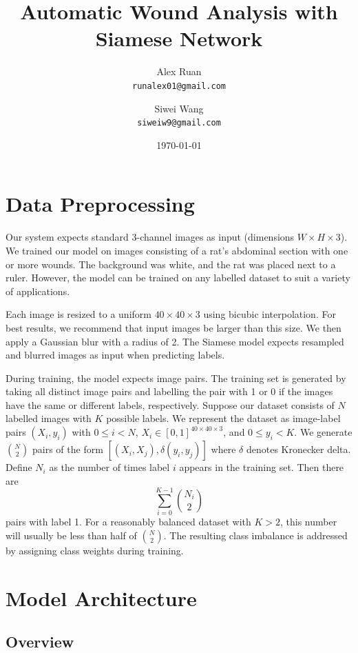 \documentclass[12pt]{article}
\title{Automatic Wound Analysis with Siamese Network}
\author{Alex Ruan \\ \texttt{runalex01@gmail.com} \and Siwei Wang \\ \texttt{siweiw9@gmail.com}}
\date{\today}
\begin{document}
\maketitle
\onehalfspacing

\section{Data Preprocessing} \label{sec:data_preprocessing}

Our system expects standard 3-channel images as input (dimensions \(W \times H \times 3\)). We trained our model on images consisting of a rat's abdominal section with one or more wounds. The background was white, and the rat was placed next to a ruler. However, the model can be trained on any labelled dataset to suit a variety of applications.

Each image is resized to a uniform \(40 \times 40 \times 3\) using bicubic interpolation. For best results, we recommend that input images be larger than this size. We then apply a Gaussian blur with a radius of 2. The Siamese model expects resampled and blurred images as input when predicting labels.

During training, the model expects image pairs. The training set is generated by taking all distinct image pairs and labelling the pair with 1 or 0 if the images have the same or different labels, respectively. Suppose our dataset consists of \(N\) labelled images with \(K\) possible labels. We represent the dataset as image-label pairs \((X_i, y_i)\) with \(0 \leq i < N\), \(X_i \in [0, 1]^{40 \times 40 \times 3}\), and \(0 \leq y_i < K\). We generate \(\binom{N}{2}\) pairs of the form \([(X_i, X_j), \delta(y_i, y_j)]\) where \(\delta\) denotes Kronecker delta. Define \(N_i\) as the number of times label \(i\) appears in the training set. Then there are
\begin{equation}
    \sum_{i = 0}^{K - 1} \binom{N_i}{2} \label{eq:same_pairs}
\end{equation}
pairs with label 1. For a reasonably balanced dataset with \(K > 2\), this number will usually be less than half of \(\binom{N}{2}\). The resulting class imbalance is addressed by assigning class weights during training.

\section{Model Architecture} \label{sec:model_architecture}

\subsection{Overview} \label{subsec:overview}
\end{document}
